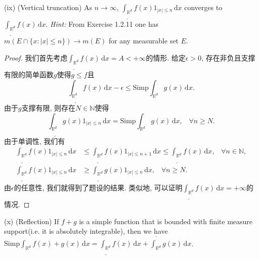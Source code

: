 \documentclass[reqno,a4paper,10pt]{amsart}
\newcommand\dif{\,\mathrm{d}}
\newcommand\Rnum{\mathbb{R}}
\newcommand{\abs}[1]{\left\vert#1\right\vert}
\begin{document}
(ix) (Vertical truncation) As $n\to \infty$, $\underline{\int_{\Rnum^d}}f(x)1_{\abs{x}\leq n}\dif x$ converges to $\underline{\int_{\Rnum^d}}f(x)\dif x$. \textit{Hint:} From Exercise 1.2.11 one has $m(E\cap\{x:\abs{x}\leq n\})\to m(E)$ for any measurable set $E$.
\begin{proof}
    我们首先考虑$\underline{\int_{\Rnum^d}}f(x)\dif x=A< +\infty$的情形. 给定$\epsilon>0$, 存在非负且支撑有限的简单函数$g$使得$g\leq f $且
    \begin{equation*}
        \underline{\int_{\Rnum^d}}f(x)\dif x-\epsilon\leq \mathrm{Simp}\int_{\Rnum^d}g(x)\dif x.
    \end{equation*}
    由于$g$支撑有限, 则存在$N\in\mathbb{N}$使得
    \begin{equation*}
        \underline{\int_{\Rnum^d}}g(x)1_{\abs{x}\leq n}\dif x=\mathrm{Simp}\int_{\Rnum^d}g(x)\dif x,\;\;\;\forall n\geq N.
    \end{equation*}
    由于单调性, 我们有
    \begin{equation*}
        \begin{split}
            \underline{\int_{\Rnum^d}}f(x)1_{\abs{x}\leq n}\dif x&\leq \underline{\int_{\Rnum^d}}f(x)1_{\abs{x}\leq n+1}\dif x\leq \underline{\int_{\Rnum^d}}f(x)\dif x,\;\;\;\forall n\in\mathbb{N},\\
            \underline{\int_{\Rnum^d}}f(x)1_{\abs{x}\leq n}\dif x&\geq \underline{\int_{\Rnum^d}}g(x)1_{\abs{x}\leq n}\dif x,\;\;\;\forall n\geq N.
        \end{split}
    \end{equation*}
    由$\epsilon$的任意性, 我们就得到了题设的结果. 类似地, 可以证明$\underline{\int_{\Rnum^d}}f(x)\dif x=+\infty$的情况. 
\end{proof}
(x) (Reflection) If $f+g$ is a simple function that is bounded with finite measure support(i.e. it is absolutely integrable), then we have $\mathrm{Simp}\int_{\Rnum^d} f(x)+g(x)\dif x=\underline{\int_{\Rnum^d}}f(x)\dif x+\overline{\int_{\Rnum^d}}g(x)\dif x$.
\end{document}
